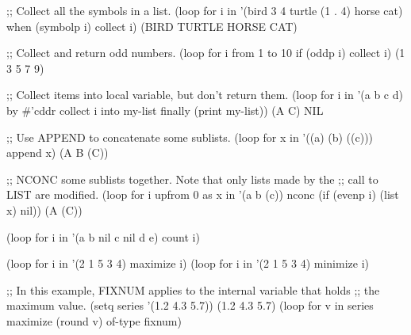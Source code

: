 % 
 

\code
;; Collect all the symbols in a list.
 (loop for i in '(bird 3 4 turtle (1 . 4) horse cat)
       when (symbolp i) collect i)
\EV (BIRD TURTLE HORSE CAT)
 
;; Collect and return odd numbers.
 (loop for i from 1 to 10
       if (oddp i) collect i)
\EV (1 3 5 7 9)
 
;; Collect items into local variable, but don't return them.
 (loop for i in '(a b c d) by #'cddr
       collect i into my-list
       finally (print my-list))
\OUT (A C) 
\EV NIL
\endcode
 
\endsubsubsection%


\code
;; Use APPEND to concatenate some sublists.
  (loop for x in '((a) (b) ((c)))
        append x)
\EV (A B (C))
 
;; NCONC some sublists together.  Note that only lists made by the
;; call to LIST are modified.
  (loop for i upfrom 0 
        as x in '(a b (c))
        nconc (if (evenp i) (list x) nil))
\EV (A (C))
\endcode

\endsubsubsection%


\code
 (loop for i in '(a b nil c nil d e)
       count i)
\endcode
 
\endsubsubsection%


\code
 (loop for i in '(2 1 5 3 4)
       maximize i)
 (loop for i in '(2 1 5 3 4)
       minimize i)
 
;; In this example, FIXNUM applies to the internal variable that holds
;; the maximum value.
 (setq series '(1.2 4.3 5.7))
\EV (1.2 4.3 5.7)
 (loop for v in series 
       maximize (round v) of-type fixnum)
 
